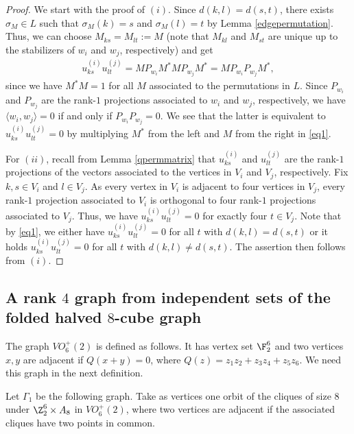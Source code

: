 \begin{proof}
We start with the proof of $(i)$. Since $d(k,l)=d(s,t)$, there exists $\sigma_M\in L$ such that $\sigma_M(k)=s$ and $\sigma_M(l)=t$ by Lemma \ref{edgepermutation}. Thus, we can choose $M_{ks}=M_{lt}:=M$ (note that $M_{kl}$ and $M_{st}$ are unique up to the stabilizers of $w_i$ and $w_j$, respectively) and get
\begin{align}\label{eq1}
    u_{ks}^{(i)}u_{lt}^{(j)}=MP_{w_i}M^*MP_{w_j}M^*=MP_{w_i}P_{w_j}M^*,
\end{align}
since we have $M^*M=1$ for all $M$ associated to the permutations in $L$. Since $P_{w_i}$ and $P_{w_j}$ are the rank-$1$ projections associated to $w_i$ and $w_j$, respectively, we have $\langle w_i,w_j \rangle=0$ if and only if $P_{w_i}P_{w_j}=0$. We see that the latter is equivalent to $u_{ks}^{(i)}u_{lt}^{(j)}=0$ by multiplying $M^*$ from the left and $M$ from the right in \eqref{eq1}. 

For $(ii)$, recall from Lemma \ref{qpermmatrix} that $u_{ks}^{(i)}$ and $u_{lt}^{(j)}$ are the rank-$1$ projections of the vectors associated to the vertices in $V_i$ and $V_j$, respectively. Fix $k,s\in V_i$ and $l\in V_j$. As every vertex in $V_i$ is adjacent to four vertices in $V_j$, every rank-$1$ projection associated to $V_i$ is orthogonal to four rank-$1$ projections associated to $V_j$. Thus, we have $u_{ks}^{(i)}u_{lt}^{(j)}=0$ for exactly four $t\in V_j$. Note that by \eqref{eq1}, we either have $u_{ks}^{(i)}u_{lt}^{(j)}=0$ for all $t$ with $d(k,l)=d(s,t)$ or it holds $u_{ks}^{(i)}u_{lt}^{(j)}=0$ for all $t$ with $d(k,l)\neq d(s,t)$. The assertion then follows from $(i)$. 
\end{proof}

\subsection[Rank 4 graph]{A rank \texorpdfstring{$4$}{4} graph from independent sets of the folded halved \texorpdfstring{$8$}{8}-cube graph}

The graph $VO_6^+(2)$ is defined as follows. It has vertex set $\F_2^6$ and two vertices $x,y$ are adjacent if $Q(x+y)=0$, where $Q(z)=z_1z_2+z_3z_4+z_5z_6$. We need this graph in the next definition. 

\begin{defi}\label{rank4graph}
Let $\Gamma_1$ be the following graph. Take as vertices one orbit of the cliques of size $8$ under $\Z_2^6\times A_8$ in $VO_6^+(2)$, where two vertices are adjacent if the associated cliques have two points in common. 
\end{defi}

